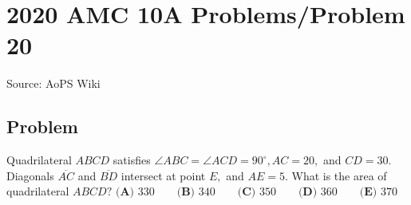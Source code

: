 \documentclass[12pt]{article}
\begin{document}
\section*{{2020 AMC 10A Problems/Problem 20}}
Source: AoPS Wiki

\subsection*{Problem}
Quadrilateral $ABCD$ satisfies $\angle ABC = \angle ACD = 90^{\circ}, AC=20,$ and $CD=30.$ Diagonals $\overline{AC}$ and $\overline{BD}$ intersect at point $E,$ and $AE=5.$ What is the area of quadrilateral $ABCD?$ $\textbf{(A) } 330 \qquad \textbf{(B) } 340 \qquad \textbf{(C) } 350 \qquad \textbf{(D) } 360 \qquad \textbf{(E) } 370$
\end{document}
